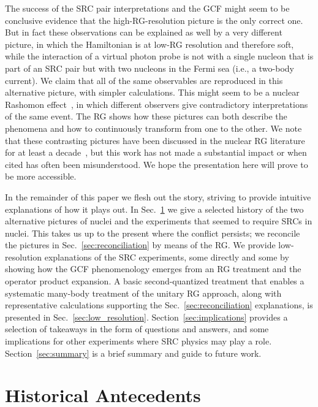 \documentclass[10pt,aps,prc,floatfix,twocolumn,nofootinbib]{revtex4-1}
\begin{document}
The success of the SRC pair interpretations and the GCF might seem to be conclusive evidence that the high-RG-resolution picture is the only correct one.
But in fact these observations can be explained as well by a very different picture, in which the Hamiltonian is at low-RG resolution and therefore soft, while the interaction of a virtual photon probe is not with a single nucleon that is part of an SRC pair but with two nucleons in the Fermi sea (i.e., a two-body current).
We claim that all of the same observables are reproduced in this alternative picture, with simpler calculations.
This might seem to be a nuclear Rashomon effect~\cite{Rashomon:2016}, in which different observers give contradictory interpretations of the same event.
The RG shows how these pictures can both describe the phenomena and how to continuously transform from one to the other.
We note that these contrasting pictures have been discussed in the nuclear RG literature for at least a decade~\cite{Anderson:2010aq,Bogner:2012zm,Furnstahl:2013dsa,Tropiano:2020zwb}, but this work has not made a substantial impact or when cited has often been misunderstood.
We hope the presentation here will prove to be more accessible.

In the remainder of this paper we flesh out the story, striving to provide intuitive explanations of how it plays out.
In Sec.~\ref{sec:historical} we give a selected history of the two alternative pictures of nuclei and the experiments that seemed to require SRCs in nuclei.
This takes us up to the present where the conflict persists; we reconcile the pictures in Sec.~\ref{sec:reconciliation} by means of the RG.
We provide low-resolution explanations of the SRC experiments, some directly and some by showing how the GCF phenomenology emerges from an RG treatment and the operator product expansion.
A basic second-quantized treatment that enables a systematic many-body treatment of the unitary RG approach, along with representative calculations supporting the Sec.~\ref{sec:reconciliation} explanations, is presented in Sec.~\ref{sec:low_resolution}.
Section~\ref{sec:implications} provides a selection of takeaways in the form of questions and answers, and some implications for other experiments where SRC physics may play a role.
Section~\ref{sec:summary} is a brief summary and guide to future work.

\section{Historical Antecedents} \label{sec:historical}
\end{document}
